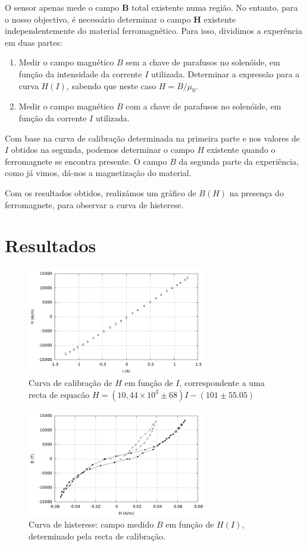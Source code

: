 \documentclass[a4paper]{article}
\begin{document}
O sensor apenas mede o campo \textbf{B} total existente numa região. No entanto, para o nosso objectivo, é necessário determinar o campo \textbf{H} existente independentemente do material ferromagnético. Para isso, dividimos a experência em duas partes:
\begin{enumerate}
\item Medir o campo magnético $B$ sem a chave de parafusos no solenóide, em função da intensidade da corrente $I$ utilizada.  Determinar a expressão para a curva $H(I)$, sabendo que neste caso $H=B/\mu_0$.
\item Medir o campo magnético $B$ com a chave de parafusos no solenóide, em função da corrente $I$ utilizada.
\end{enumerate}

Com base na curva de calibração determinada na primeira parte e nos valores de $I$ obtidos na segunda, podemos determinar o campo $H$ existente quando o ferromagnete se encontra presente. O campo $B$ da segunda parte da experiência, como já vimos, dá-nos a magnetização do material.

Com os resultados obtidos, realizámos um gráfico de $B(H)$ na presença do ferromagnete, para observar a curva de histerese.

\section{Resultados}

\begin{figure}[htbp]
\centering
\includegraphics[width=0.7\textwidth]{./Imagens/grafico1.pdf}
\caption{Curva de calibração de $H$ em função de $I$, correspondente a uma recta de equacão $H=(10,44\times 10^3 \pm 68)I-(101\pm 55.05)$}
\end{figure}

\begin{figure}[htbp]
\centering
\includegraphics[width=0.7\textwidth]{./Imagens/grafico2.pdf}
\caption{Curva de histerese: campo medido $B$ em função de $H(I)$, determinado pela recta de calibração.}
\end{figure}
\end{document}
